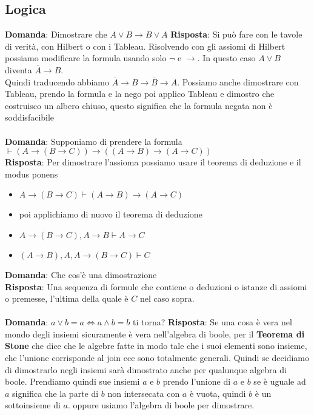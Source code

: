 \documentclass{article}
\begin{document}
\subsection{Logica}
\textbf{Domanda}: Dimostrare che $A \lor B \to B \lor A$
\textbf{Risposta}: Si può fare con le tavole di verità, con Hilbert o con i Tableau. Risolvendo con gli assiomi di Hilbert possiamo modificare la formula usando solo $\lnot$ e $\to$. In questo caso $A \lor B$ diventa $\overline{A} \to B$. \\
Quindi traducendo abbiamo $\overline{A} \to B \to \overline{B} \to A$. Possiamo anche dimostrare con Tableau, prendo la formula e la nego poi applico Tableau e dimostro che costruisco un albero chiuso, questo significa che la formula negata non è soddisfacibile \\ \\
\textbf{Domanda}: Supponiamo di prendere la formula $\vdash (A \to (B \to C)) \to ((A \to B) \to (A \to C))$ \\
\textbf{Risposta}: Per dimostrare l'assioma possiamo usare il teorema di deduzione e il modus ponens
\begin{itemize}
    \item $A \to (B \to C) \vdash (A \to B) \to (A \to C)$
    \item poi applichiamo di nuovo il teorema di deduzione
    \item $A \to (B \to C), A \to B \vdash A \to C$
    \item $(A \to B), A, A \to (B \to C) \vdash C$
\end{itemize}
\textbf{Domanda}: Che cos'è una dimostrazione \\
\textbf{Risposta}: Una sequenza di formule che contiene o deduzioni o istanze di assiomi o premesse, l'ultima della quale è $C$ nel caso sopra. \\ \\
\textbf{Domanda}: $a \lor b = a \iff a \land b = b$ ti torna?
\textbf{Risposta}: Se una cosa è vera nel mondo degli insiemi sicuramente è vera nell'algebra di boole, per il \textbf{Teorema di Stone} che dice che le algebre fatte in modo tale che i suoi elementi sono insieme, che l'unione corrisponde al join ecc sono totalmente generali. Quindi se decidiamo di dimostrarlo negli insiemi sarà dimostrato anche per qualunque algebra di boole. Prendiamo quindi sue insiemi $a$ e $b$
prendo l'unione di $a$ e $b$ se è uguale ad $a$ significa che la parte di $b$ non intersecata con $a$ è vuota, quindi $b$ è un sottoinsieme di $a$. oppure usiamo l'algebra di boole per dimostrare. \\
\end{document}
